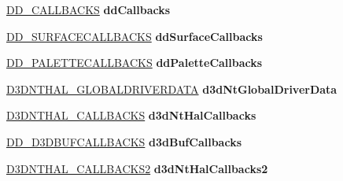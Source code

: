 \begin{DoxyCompactItemize}
\hyperlink{struct_d_d___c_a_l_l_b_a_c_k_s}{D\+D\+\_\+\+C\+A\+L\+L\+B\+A\+C\+KS} {\bfseries dd\+Callbacks}
\item 
\mbox{\label{struct___e_d_d___d_i_r_e_c_t_d_r_a_w___g_l_o_b_a_l_af51e7a253cf151533c76276f11c88509}} 
\hyperlink{struct_d_d___s_u_r_f_a_c_e_c_a_l_l_b_a_c_k_s}{D\+D\+\_\+\+S\+U\+R\+F\+A\+C\+E\+C\+A\+L\+L\+B\+A\+C\+KS} {\bfseries dd\+Surface\+Callbacks}
\item 
\mbox{\label{struct___e_d_d___d_i_r_e_c_t_d_r_a_w___g_l_o_b_a_l_ad49a92801ed02b1253df60cc7fb2e115}} 
\hyperlink{struct_d_d___p_a_l_e_t_t_e_c_a_l_l_b_a_c_k_s}{D\+D\+\_\+\+P\+A\+L\+E\+T\+T\+E\+C\+A\+L\+L\+B\+A\+C\+KS} {\bfseries dd\+Palette\+Callbacks}
\item 
\mbox{\label{struct___e_d_d___d_i_r_e_c_t_d_r_a_w___g_l_o_b_a_l_a54fd8f477a19d4f933733736109c88aa}} 
\hyperlink{struct___d3_d_n_t_h_a_l___g_l_o_b_a_l_d_r_i_v_e_r_d_a_t_a}{D3\+D\+N\+T\+H\+A\+L\+\_\+\+G\+L\+O\+B\+A\+L\+D\+R\+I\+V\+E\+R\+D\+A\+TA} {\bfseries d3d\+Nt\+Global\+Driver\+Data}
\item 
\mbox{\label{struct___e_d_d___d_i_r_e_c_t_d_r_a_w___g_l_o_b_a_l_af2879ba33dac1a64196351e3e16f7dbf}} 
\hyperlink{struct___d3_d_n_t_h_a_l___c_a_l_l_b_a_c_k_s}{D3\+D\+N\+T\+H\+A\+L\+\_\+\+C\+A\+L\+L\+B\+A\+C\+KS} {\bfseries d3d\+Nt\+Hal\+Callbacks}
\item 
\mbox{\label{struct___e_d_d___d_i_r_e_c_t_d_r_a_w___g_l_o_b_a_l_aa728e2499e90b252767404a5b0d294f7}} 
\hyperlink{struct___d_d___d3_d_b_u_f_c_a_l_l_b_a_c_k_s}{D\+D\+\_\+\+D3\+D\+B\+U\+F\+C\+A\+L\+L\+B\+A\+C\+KS} {\bfseries d3d\+Buf\+Callbacks}
\item 
\mbox{\label{struct___e_d_d___d_i_r_e_c_t_d_r_a_w___g_l_o_b_a_l_a077c1920d0b01e2887afc3bbf0b247de}} 
\hyperlink{struct___d3_d_n_t_h_a_l___c_a_l_l_b_a_c_k_s2}{D3\+D\+N\+T\+H\+A\+L\+\_\+\+C\+A\+L\+L\+B\+A\+C\+K\+S2} {\bfseries d3d\+Nt\+Hal\+Callbacks2}
\item 
\mbox{\label{struct___e_d_d___d_i_r_e_c_t_d_r_a_w___g_l_o_b_a_l_a9c13d99bcf68209ab7b200506fd45470}} 

\end{DoxyCompactItemize}
